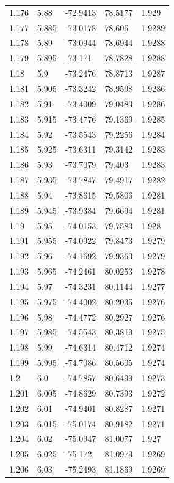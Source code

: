 \begin{tabular}{lllll}
1.176 & 5.88 & -72.9413 & 78.5177 & 1.929 \\
1.177 & 5.885 & -73.0178 & 78.606 & 1.9289 \\
1.178 & 5.89 & -73.0944 & 78.6944 & 1.9288 \\
1.179 & 5.895 & -73.171 & 78.7828 & 1.9288 \\
1.18 & 5.9 & -73.2476 & 78.8713 & 1.9287 \\
1.181 & 5.905 & -73.3242 & 78.9598 & 1.9286 \\
1.182 & 5.91 & -73.4009 & 79.0483 & 1.9286 \\
1.183 & 5.915 & -73.4776 & 79.1369 & 1.9285 \\
1.184 & 5.92 & -73.5543 & 79.2256 & 1.9284 \\
1.185 & 5.925 & -73.6311 & 79.3142 & 1.9283 \\
1.186 & 5.93 & -73.7079 & 79.403 & 1.9283 \\
1.187 & 5.935 & -73.7847 & 79.4917 & 1.9282 \\
1.188 & 5.94 & -73.8615 & 79.5806 & 1.9281 \\
1.189 & 5.945 & -73.9384 & 79.6694 & 1.9281 \\
1.19 & 5.95 & -74.0153 & 79.7583 & 1.928 \\
1.191 & 5.955 & -74.0922 & 79.8473 & 1.9279 \\
1.192 & 5.96 & -74.1692 & 79.9363 & 1.9279 \\
1.193 & 5.965 & -74.2461 & 80.0253 & 1.9278 \\
1.194 & 5.97 & -74.3231 & 80.1144 & 1.9277 \\
1.195 & 5.975 & -74.4002 & 80.2035 & 1.9276 \\
1.196 & 5.98 & -74.4772 & 80.2927 & 1.9276 \\
1.197 & 5.985 & -74.5543 & 80.3819 & 1.9275 \\
1.198 & 5.99 & -74.6314 & 80.4712 & 1.9274 \\
1.199 & 5.995 & -74.7086 & 80.5605 & 1.9274 \\
1.2 & 6.0 & -74.7857 & 80.6499 & 1.9273 \\
1.201 & 6.005 & -74.8629 & 80.7393 & 1.9272 \\
1.202 & 6.01 & -74.9401 & 80.8287 & 1.9271 \\
1.203 & 6.015 & -75.0174 & 80.9182 & 1.9271 \\
1.204 & 6.02 & -75.0947 & 81.0077 & 1.927 \\
1.205 & 6.025 & -75.172 & 81.0973 & 1.9269 \\
1.206 & 6.03 & -75.2493 & 81.1869 & 1.9269 \\

\end{tabular}
